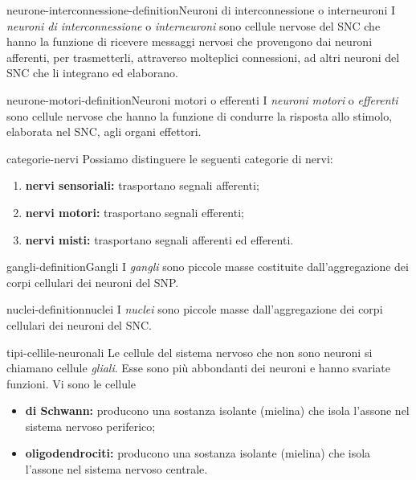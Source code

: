 \documentclass[preview]{standalone}
\begin{document}
\begin{snippetdefinition}{neurone-interconnessione-definition}{Neuroni di interconnessione o interneuroni}
    I \textit{neuroni di interconnessione} o \textit{interneuroni} sono
    cellule nervose del SNC che hanno la funzione di ricevere messaggi nervosi che
    provengono dai neuroni afferenti, per trasmetterli, attraverso molteplici connessioni, ad altri
    neuroni del SNC che li integrano ed elaborano.
\end{snippetdefinition}

\begin{snippetdefinition}{neurone-motori-definition}{Neuroni motori o efferenti}
    I \textit{neuroni motori} o \textit{efferenti} sono
    cellule nervose che hanno la funzione di condurre la risposta allo stimolo, elaborata nel
    SNC, agli organi effettori.
\end{snippetdefinition}

\begin{snippet}{categorie-nervi}
    Possiamo distinguere le seguenti categorie di nervi:
    \begin{enumerate}
        \item \textbf{nervi sensoriali:} trasportano segnali afferenti;
        \item \textbf{nervi motori:} trasportano segnali efferenti;
        \item \textbf{nervi misti:} trasportano segnali afferenti ed efferenti.
    \end{enumerate}
\end{snippet}

\begin{snippetdefinition}{gangli-definition}{Gangli}
    I \textit{gangli} sono piccole masse
    costituite dall'aggregazione dei corpi cellulari dei neuroni del SNP.
\end{snippetdefinition}

\begin{snippetdefinition}{nuclei-definition}{nuclei}
    I \textit{nuclei} sono piccole masse
    dall'aggregazione dei corpi cellulari dei neuroni del SNC.
\end{snippetdefinition}

\begin{snippet}{tipi-cellile-neuronali}
    Le cellule del sistema nervoso che non sono neuroni si chiamano cellule \textit{gliali}.
    Esse sono più abbondanti dei neuroni e hanno svariate funzioni.
    Vi sono le cellule
    \begin{itemize}
        \item \textbf{di Schwann:} producono una sostanza isolante (mielina) che isola l'assone nel sistema nervoso periferico;
        \item \textbf{oligodendrociti:} producono una sostanza isolante (mielina) che isola l'assone nel sistema nervoso centrale.
    \end{itemize}
\end{snippet}
\end{document}
